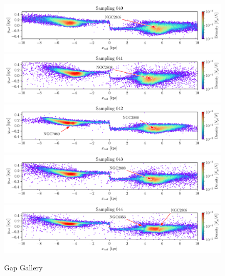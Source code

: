 \documentclass[draft]{aa}
\begin{document}
\begin{appendix}
    \begin{figure}
      \centering
      \includegraphics[width=\linewidth]{gallery_of_gaps_monte-carlo-040.png}
      \includegraphics[width=\linewidth]{gallery_of_gaps_monte-carlo-041.png}
      \includegraphics[width=\linewidth]{gallery_of_gaps_monte-carlo-042.png}
      \includegraphics[width=\linewidth]{gallery_of_gaps_monte-carlo-043.png}
      \includegraphics[width=\linewidth]{gallery_of_gaps_monte-carlo-044.png}
      \caption{Gap Gallery}
      \label{fig:TailCoordinates}
    \end{figure}        


\end{appendix}
\end{document}
